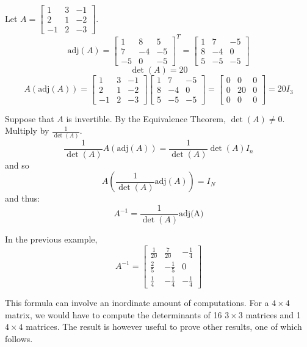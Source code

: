 \documentclass[12pt]{article}
\begin{document}
 \begin{example} Let $A = \begin{bmatrix} 1 & 3 & -1 \\ 2 & 1 & -2 \\ -1 & 2 & -3 \end{bmatrix}$. $$ \text{adj}(A) = \begin{bmatrix} 1 & 8 & 5 \\ 7 & -4 & -5 \\ -5 & 0 & -5 \end{bmatrix} ^T = \begin{bmatrix} 1 & 7 & -5 \\ 8 & -4 & 0 \\ 5 & -5 & -5 \end{bmatrix} $$ $$ \det(A) = 20 $$ $$ A(\text{adj}(A)) = \begin{bmatrix} 1 & 3 & -1 \\ 2 & 1 & -2 \\ -1 & 2 & -3 \end{bmatrix} \begin{bmatrix} 1 & 7 & -5 \\ 8 & -4 & 0 \\ 5 & -5 & -5 \end{bmatrix} = \begin{bmatrix} 0 & 0 & 0 \\ 0 & 20 & 0 \\ 0 & 0 & 0 \end{bmatrix} = 20I_3 $$ \end{example} 
Suppose that $A$ is invertible. By the Equivalence Theorem, $\det(A) \neq 0$. Multiply by $\frac{1}{\det(A)}$. $$ \frac{1}{\det(A)}A(\text{adj}(A)) = \frac{1}{\det(A)}\det(A)I_n $$ and so $$ A(\frac{1}{\det(A)}\text{adj}(A)) = I_N $$ and thus: $$ A^{-1} = \frac{1}{\det(A)}\text{adj(A)} $$ 
\begin{example} In the previous example, $$ A^{-1} = \begin{bmatrix} \frac{1}{20} & \frac{7}{20} & -\frac{1}{4} \\ \frac{2}{5} & -\frac{1}{5} & 0 \\ \frac{1}{4} & -\frac{1}{4} & -\frac{1}{4} \end{bmatrix} $$ \end{example} 
This formula can involve an inordinate amount of computations. For a $4 \times 4$ matrix, we would have to compute the determinants of 16 $3 \times 3$ matrices and 1 $4 \times 4$ matrices. The result is however useful to prove other results, one of which follows. 
\end{document}
